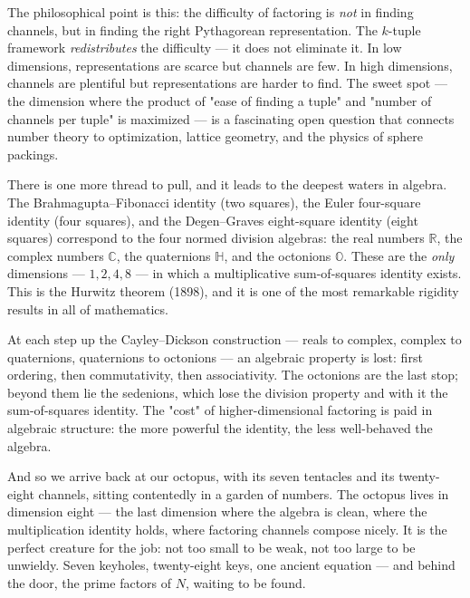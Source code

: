 \documentclass[11pt,openright,twoside]{book}
\theoremstyle{definition}
\begin{document}
The philosophical point is this: the difficulty of factoring is \textit{not} in finding channels, but in finding the right Pythagorean representation. The $k$-tuple framework \textit{redistributes} the difficulty --- it does not eliminate it. In low dimensions, representations are scarce but channels are few. In high dimensions, channels are plentiful but representations are harder to find. The sweet spot --- the dimension where the product of "ease of finding a tuple" and "number of channels per tuple" is maximized --- is a fascinating open question that connects number theory to optimization, lattice geometry, and the physics of sphere packings.

There is one more thread to pull, and it leads to the deepest waters in algebra. The Brahmagupta--Fibonacci identity (two squares), the Euler four-square identity (four squares), and the Degen--Graves eight-square identity (eight squares) correspond to the four normed division algebras: the real numbers $\mathbb{R}$, the complex numbers $\mathbb{C}$, the quaternions $\mathbb{H}$, and the octonions $\mathbb{O}$. These are the \textit{only} dimensions --- $1, 2, 4, 8$ --- in which a multiplicative sum-of-squares identity exists. This is the Hurwitz theorem (1898), and it is one of the most remarkable rigidity results in all of mathematics.

At each step up the Cayley--Dickson construction --- reals to complex, complex to quaternions, quaternions to octonions --- an algebraic property is lost: first ordering, then commutativity, then associativity. The octonions are the last stop; beyond them lie the sedenions, which lose the division property and with it the sum-of-squares identity. The "cost" of higher-dimensional factoring is paid in algebraic structure: the more powerful the identity, the less well-behaved the algebra.

And so we arrive back at our octopus, with its seven tentacles and its twenty-eight channels, sitting contentedly in a garden of numbers. The octopus lives in dimension eight --- the last dimension where the algebra is clean, where the multiplication identity holds, where factoring channels compose nicely. It is the perfect creature for the job: not too small to be weak, not too large to be unwieldy. Seven keyholes, twenty-eight keys, one ancient equation --- and behind the door, the prime factors of $N$, waiting to be found.
\end{document}
